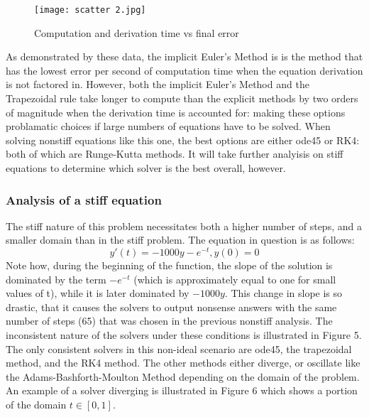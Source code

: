 \documentclass[11pt]{article}
\begin{document}
\begin{figure} [h]
\centering
        \texttt{[image: scatter 2.jpg]}
    \caption{Computation and derivation time vs final error}
    \label{fig:verticalcell}
\end{figure}

As demonstrated by these data, the implicit Euler's Method is is the method 
that has the lowest error per second of computation time when the equation
derivation is not factored in. However, both the implicit Euler's Method and 
the Trapezoidal rule take longer to compute than the explicit methods by two orders
of magnitude when the derivation time is accounted for: making these options
problamatic choices if large numbers of equations have to be solved. When solving
nonstiff equations like this one, the best options are either ode45 or RK4: both
of which are Runge-Kutta methods. It will take further analyisis on stiff equations
to determine which solver is the best overall, however.

\subsubsection{Analysis of a stiff equation}
%
The stiff nature of this problem necessitates both a higher number of steps, and a 
smaller domain than in the stiff problem. The equation in question is as follows: 
$$y'(t)=-1000y-e^{-t}, y(0)=0$$
Note how, during the beginning of the function, the slope of the solution is 
dominated by the term $-e^{-t}$ (which is approximately equal to one for small 
values of t), while it is later dominated by $-1000y$. This change in slope is so
drastic, that it causes the solvers to output nonsense answers with the same
number of steps (65) that was chosen in the previous
nonstiff analysis. The inconsistent nature of the solvers under these conditions
is illustrated in Figure 5. The only consistent solvers in this non-ideal scenario
are ode45, the trapezoidal method, and the RK4 method. The other methods either
diverge, or oscillate like the Adams-Bashforth-Moulton Method depending on the 
domain of the problem. An example of a solver diverging is illustrated in Figure
6 which shows a portion of the domain $t\in [0,1]$.
\end{document}
